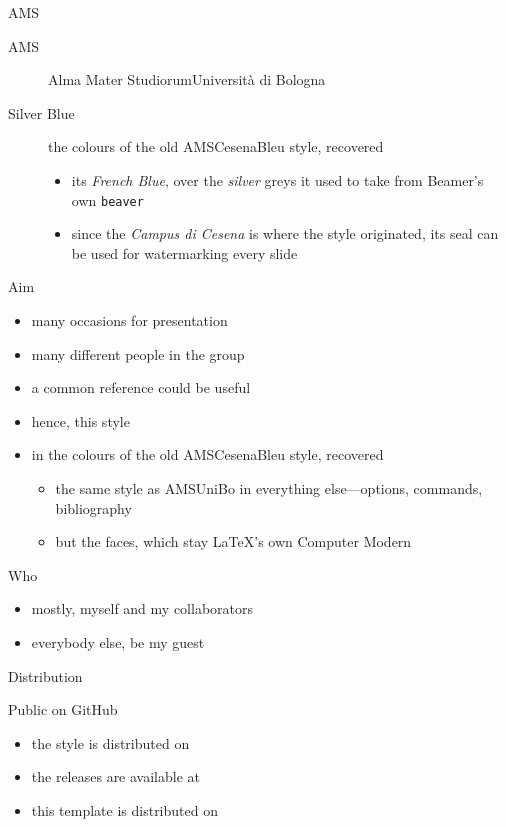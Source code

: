 \documentclass[presentation,cesena,apice]{beamer}\mode<presentation>{\usetheme{AMSSilverBlue}}
\begin{document}
\begin{frame}[c]{AMS}
%
\begin{description}
	\item[AMS] Alma Mater Studiorum\textendash{}Università di Bologna
	\item[Silver Blue] the colours of the old \alert{AMSCesenaBleu} style, recovered
	\begin{itemize}
		\item its \textcolor{sbblue}{\textit{French Blue}}, over the \textcolor{sbgreymid}{\textit{silver}} greys it used to take from Beamer's own \texttt{beaver}
		\item since the \emph{Campus di Cesena} is where the style originated, its seal can be used for watermarking every slide
	\end{itemize}
\end{description}
%
\end{frame}

\begin{frame}[c]{Aim}
%
\begin{itemize}
	\item many occasions for presentation
	\item many different people in the group
	\item a common reference could be useful
	\item hence, this style
	\item in the colours of the old \alert{AMSCesenaBleu} style, recovered
	\begin{itemize}
		\item the same style as \alert{AMSUniBo} in everything else---options, commands, bibliography
		\item but the faces, which stay \LaTeX{}'s own Computer Modern
	\end{itemize}
\end{itemize}
%
\end{frame}

\begin{frame}[c]{Who}
%
\begin{itemize}
	\item mostly, myself and my collaborators
	\item everybody else, be my guest
\end{itemize}
%
\end{frame}

\begin{frame}[c]{Distribution}
%
\begin{block}{Public on GitHub}
	\begin{itemize}
		\item the style is distributed on 
		\item the releases are available at 
		\item this template is distributed on 
	\end{itemize}
\end{block}
%
\end{frame}
\end{document}
